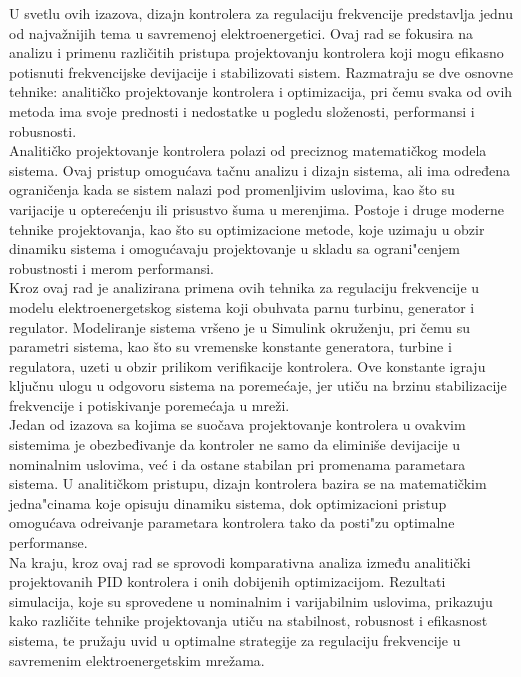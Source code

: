 \documentclass[a4paper,11pt]{article}
\theoremstyle{definition} \newtheorem{deff}{Definicija}[section]
\theoremstyle{definition} \newtheorem{prim}[deff]{Primer}
\theoremstyle{plain} \newtheorem{teor}[deff]{Teorema}
\begin{document}
	U svetlu ovih izazova, dizajn kontrolera za regulaciju frekvencije predstavlja jednu od najvažnijih tema u savremenoj elektroenergetici. Ovaj rad se fokusira na analizu i primenu različitih pristupa projektovanju kontrolera koji mogu efikasno potisnuti frekvencijske devijacije i stabilizovati sistem. Razmatraju se dve osnovne tehnike: analitičko projektovanje kontrolera i optimizacija, pri čemu svaka od ovih metoda ima svoje prednosti i nedostatke u pogledu složenosti, performansi i robusnosti. \\
	
	Analitičko projektovanje kontrolera polazi od preciznog matematičkog modela sistema. Ovaj pristup omogućava tačnu analizu i dizajn sistema, ali ima određena ograničenja kada se sistem nalazi pod promenljivim uslovima, kao što su varijacije u opterećenju ili prisustvo šuma u merenjima. Postoje i druge moderne tehnike projektovanja, kao što su optimizacione metode, koje uzimaju u obzir dinamiku sistema i omogućavaju projektovanje u skladu sa ograni"cenjem robustnosti i merom performansi.\\
	
	Kroz ovaj rad je analizirana primena ovih tehnika za regulaciju frekvencije u modelu elektroenergetskog sistema koji obuhvata parnu turbinu, generator i regulator. Modeliranje sistema vršeno je u Simulink okruženju, pri čemu su parametri sistema, kao što su vremenske konstante generatora, turbine i regulatora, uzeti u obzir prilikom verifikacije kontrolera. Ove konstante igraju ključnu ulogu u odgovoru sistema na poremećaje, jer utiču na brzinu stabilizacije frekvencije i potiskivanje poremećaja u mreži.\\
	
	Jedan od izazova sa kojima se suočava projektovanje kontrolera u ovakvim sistemima je obezbeđivanje da kontroler ne samo da eliminiše devijacije u nominalnim uslovima, već i da ostane stabilan pri promenama parametara sistema. U analitičkom pristupu, dizajn kontrolera bazira se na matematičkim jedna"cinama koje opisuju dinamiku sistema, dok optimizacioni pristup omogućava odre\dj{}ivanje parametara kontrolera tako da posti"zu optimalne performanse.\\
	
	Na kraju, kroz ovaj rad se sprovodi komparativna analiza između analitički projektovanih PID kontrolera i onih dobijenih optimizacijom. Rezultati simulacija, koje su sprovedene u nominalnim i varijabilnim uslovima, prikazuju kako različite tehnike projektovanja utiču na stabilnost, robusnost i efikasnost sistema, te pružaju uvid u optimalne strategije za regulaciju frekvencije u savremenim elektroenergetskim mrežama.\\
	
\end{document}
